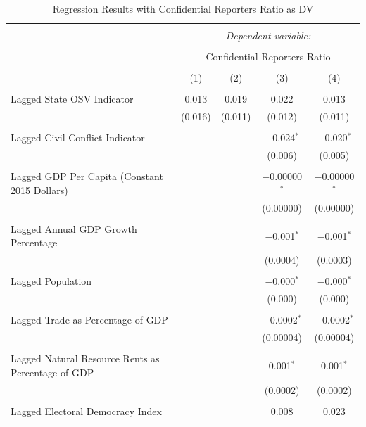 \documentclass[11pt, titlepage]{article} %
\begin{document}
\begin{table}[!htbp] \centering 
  \caption{Regression Results with Confidential Reporters Ratio as DV} 
  \label{table:confidential} 
\small 
\begin{tabular}{@{\extracolsep{5pt}}lcccc} 
\\[-1.8ex]\hline 
\hline \\[-1.8ex] 
 & \multicolumn{4}{c}{\textit{Dependent variable:}} \\ 
\cline{2-5} 
\\[-1.8ex] & \multicolumn{4}{c}{Confidential Reporters Ratio} \\ 
\\[-1.8ex] & (1) & (2) & (3) & (4)\\ 
\hline \\[-1.8ex] 
 Lagged State OSV Indicator & 0.013 & 0.019 & 0.022 & 0.013 \\ 
  & (0.016) & (0.011) & (0.012) & (0.011) \\ 
  & & & & \\ 
 Lagged Civil Conflict Indicator &  &  & $-$0.024$^{*}$ & $-$0.020$^{*}$ \\ 
  &  &  & (0.006) & (0.005) \\ 
  & & & & \\ 
 Lagged GDP Per Capita (Constant 2015 Dollars) &  &  & $-$0.00000$^{*}$ & $-$0.00000$^{*}$ \\ 
  &  &  & (0.00000) & (0.00000) \\ 
  & & & & \\ 
 Lagged Annual GDP Growth Percentage &  &  & $-$0.001$^{*}$ & $-$0.001$^{*}$ \\ 
  &  &  & (0.0004) & (0.0003) \\ 
  & & & & \\ 
 Lagged Population &  &  & $-$0.000$^{*}$ & $-$0.000$^{*}$ \\ 
  &  &  & (0.000) & (0.000) \\ 
  & & & & \\ 
 Lagged Trade as Percentage of GDP &  &  & $-$0.0002$^{*}$ & $-$0.0002$^{*}$ \\ 
  &  &  & (0.00004) & (0.00004) \\ 
  & & & & \\ 
 Lagged Natural Resource Rents as Percentage of GDP &  &  & 0.001$^{*}$ & 0.001$^{*}$ \\ 
  &  &  & (0.0002) & (0.0002) \\ 
  & & & & \\ 
 Lagged Electoral Democracy Index &  &  & 0.008 & 0.023 \\ 

\end{tabular}
\end{table}
\end{document}
